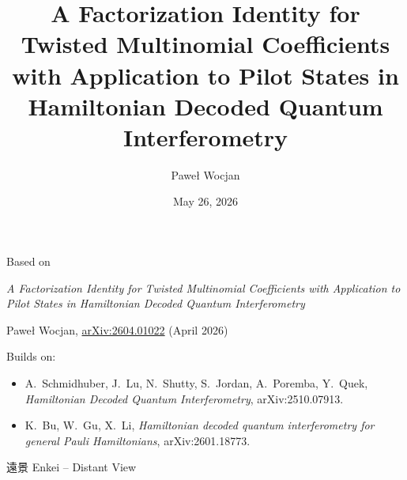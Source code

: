\documentclass{beamer}
\title{A Factorization Identity for\\
Twisted Multinomial Coefficients\\
with Application to Pilot States in\\
Hamiltonian Decoded Quantum Interferometry}
\author{Pawe\l{} Wocjan}
\institute{Quantum Algorithms Group, IBM Quantum}
\date{May 26, 2026}
\renewcommand{\>}{\rangle}
\newcommand{\<}{\langle}
\newcommand{\fujimountain}[3]{%
  \begin{scope}[shift={(#1, #2)}, scale=#3]
    \fill[fujishadow]
      (-3.2, 0) -- (-1.05, 1.25) 
      .. controls (-0.7, 1.45) and (-0.5, 1.55) .. (-0.4, 1.62)
      .. controls (-0.2, 1.68) and (0.2, 1.68) .. (0.4, 1.62)
      .. controls (0.5, 1.55) and (0.7, 1.45) .. (1.05, 1.25)
      -- (3.2, 0) -- cycle;
    \draw[neonpurple, line width=1.0pt, opacity=0.9]
      (-3.2, 0) -- (-1.05, 1.25) 
      .. controls (-0.7, 1.45) and (-0.5, 1.55) .. (-0.4, 1.62)
      .. controls (-0.2, 1.68) and (0.2, 1.68) .. (0.4, 1.62)
      .. controls (0.5, 1.55) and (0.7, 1.45) .. (1.05, 1.25)
      -- (3.2, 0);
    \fill[white, opacity=0.92]
      (-0.55, 1.32) 
      -- (-0.4, 1.62)
      .. controls (-0.2, 1.68) and (0.2, 1.68) .. (0.4, 1.62)
      -- (0.55, 1.32)
      -- (0.48, 1.36) -- (0.40, 1.30) -- (0.30, 1.38) -- (0.20, 1.31) 
      -- (0.10, 1.38) -- (0.00, 1.30) -- (-0.10, 1.37) -- (-0.20, 1.30) 
      -- (-0.30, 1.38) -- (-0.40, 1.31) -- (-0.48, 1.36) -- cycle;
  \end{scope}
}
\newcommand{\synthwavegrid}[2]{%
  \begin{scope}[shift={(0,#1)}]
    \foreach \i in {0,1,...,20} {
      \pgfmathsetmacro{\xL}{-6 + 0.6*\i}
      \pgfmathsetmacro{\op}{0.3 + 0.5*(\i/20)}
      \draw[neongrid, opacity=\op, thick] (\xL, 0) -- (0, #2);
    }
    \foreach \k in {0,1,...,8} {
      \pgfmathsetmacro{\y}{#2 - #2*(1 - 1/(1 + 0.4*\k))}
      \pgfmathsetmacro{\op}{0.3 + 0.5*(\k/8)}
      \pgfmathsetmacro{\w}{6 - 6*(1 - 1/(1 + 0.4*\k))}
      \draw[neongrid, opacity=\op, thick] (-\w, \y) -- (\w, \y);
    }
  \end{scope}
}
\begin{document}
\begin{frame}
  \titlepage
\end{frame}


\begin{frame}{Based on}

    \emph{A Factorization Identity for Twisted Multinomial Coefficients
    with Application to Pilot States in Hamiltonian Decoded Quantum
    Interferometry}

    \medskip
    Pawe\l{} Wocjan, \href{https://arxiv.org/abs/2604.01022}{arXiv:2604.01022} (April 2026)

    \bigskip\bigskip
    Builds on:

    \medskip
    \begin{itemize}
        \item A.~Schmidhuber, J.~Lu, N.~Shutty, S.~Jordan, A.~Poremba, Y.~Quek, \emph{Hamiltonian Decoded Quantum Interferometry},
        arXiv:2510.07913.

        \medskip
        \item K.~Bu, W.~Gu, X.~Li, \emph{Hamiltonian decoded quantum interferometry for general Pauli Hamiltonians}, arXiv:2601.18773.
    \end{itemize}
\end{frame}


\begin{frame}{遠景 Enkei -- Distant View}

\begin{center}
\end{center}
\end{frame}
\end{document}
